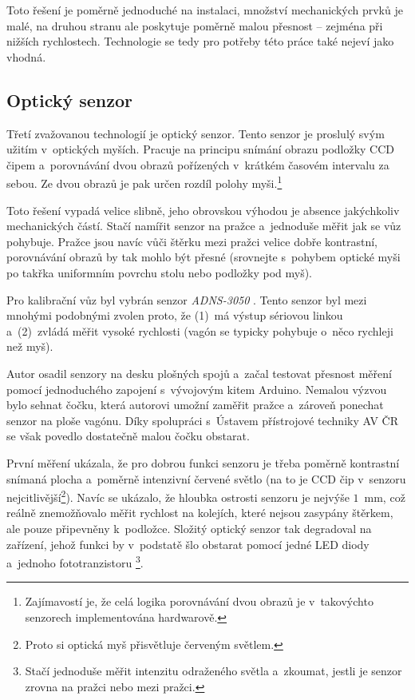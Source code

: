 Toto řešení je poměrně jednoduché na instalaci, množství mechanických prvků je
malé, na druhou stranu ale poskytuje poměrně malou přesnost -- zejména při
nižších rychlostech. Technologie  se tedy pro potřeby této
práce také nejeví jako vhodná.

\subsection{Optický senzor}
\label{subsec:wsm-senzor-opto}

Třetí zvažovanou technologií je optický senzor. Tento senzor je proslulý svým
užitím v~optických myších. Pracuje na principu snímání obrazu podložky CCD
čipem a~porovnávání dvou obrazů pořízených v~krátkém časovém intervalu za
sebou. Ze dvou obrazů je pak určen rozdíl polohy myši.\footnote{Zajímavostí
je, že celá logika porovnávání dvou obrazů je v~takovýchto senzorech
implementována hardwarově.}

Toto řešení vypadá velice slibně, jeho obrovskou výhodou je absence jakýchkoliv
mechanických částí. Stačí namířit senzor na pražce a~jednoduše měřit jak se vůz
pohybuje. Pražce jsou navíc vůči štěrku mezi pražci velice dobře kontrastní,
porovnávání obrazů by tak mohlo být přesné (srovnejte s~pohybem optické
myši po takřka uniformním povrchu stolu nebo podložky pod myš).

Pro kalibrační vůz byl vybrán senzor \textit{ADNS-3050} \cite{adns-3050}.
Tento senzor byl mezi mnohými podobnými zvolen proto, že (1)~má výstup sériovou
linkou a~(2)~zvládá měřit vysoké rychlosti (vagón se typicky pohybuje o~něco
rychleji než myš).

Autor osadil senzory na desku plošných spojů a~začal testovat přesnost měření
pomocí jednoduchého zapojení s~vývojovým kitem Arduino. Nemalou výzvou bylo
sehnat čočku, která autorovi umožní zaměřit pražce a~zároveň ponechat senzor na
ploše vagónu. Díky spolupráci s~Ústavem přístrojové techniky AV ČR se však
povedlo dostatečně malou čočku obstarat.

První měření ukázala, že pro dobrou funkci senzoru je třeba poměrně kontrastní
snímaná plocha a~poměrně intenzivní červené světlo (na to je CCD čip v~senzoru
nejcitlivější\footnote{Proto si optická myš přisvětluje červeným světlem.}).
Navíc se ukázalo, že hloubka ostrosti senzoru je nejvýše $1$~mm, což reálně
znemožňovalo měřit rychlost na kolejích, které nejsou zasypány štěrkem, ale
pouze připevněny k~podložce. Složitý optický senzor tak degradoval na zařízení,
jehož funkci by v~podstatě šlo obstarat pomocí jedné LED diody a~jednoho
fototranzistoru \footnote{Stačí jednoduše měřit intenzitu odraženého světla
a~zkoumat, jestli je senzor zrovna na pražci nebo mezi pražci.}.

